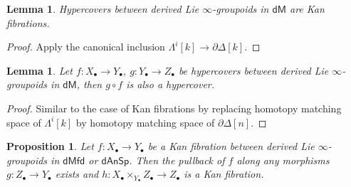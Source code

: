 \documentclass[12pt]{amsart}
\newtheorem{lem}[thm]{Lemma}
\newtheorem{prop}[thm]{Proposition}
\theoremstyle{definition}
\theoremstyle{remark}
\numberwithin{equation}{section}
\newcommand{\del}{\partial}
\renewcommand{\del}{\partial}
\newcommand{\1}{{\mathbb{1}}}
\newcommand{\dm}{\mathsf{dM}}
\newcommand{\dmfd}{\mathsf{dMfd}}
\newcommand{\dan}{\mathsf{dAnSp}}
\begin{document}
\begin{lem}
    Hypercovers between derived Lie $\infty$-groupoids in $\dm$ are Kan fibrations.
\end{lem}
\begin{proof}
    Apply the canonical inclusion $\Lambda^i[k] \to \del \Delta[k]$.
\end{proof}

\begin{lem}
    Let $f: X_{\bullet}\to Y_{\bullet}$, $g: Y_{\bullet}\to Z_{\bullet}$ be hypercovers between derived Lie $\infty$-groupoids in $\dm$, then $g\circ f $ is also a hypercover.
\end{lem}
\begin{proof}
    Similar to the case of Kan fibrations by replacing homotopy matching space of $\Lambda^{i}[k]$ by homotopy matching space of $\del \Delta[n]$.
\end{proof}

\begin{prop}\label{pb1}
	Let $f:X_{\bullet}\to Y_{\bullet}$ be a Kan fibration between derived Lie $\infty$-groupoids in $\dmfd$ or $\dan$. Then the  pullback of $f$ along any morphisms
	$g: Z_{\bullet}\to Y_{\bullet}$ exists and $h: X_{\bullet} \times_{Y_{\bullet}} Z_{\bullet} \to Z_{\bullet}$ is a Kan fibration.
\end{prop}
\end{document}
